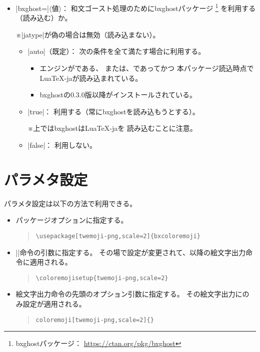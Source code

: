 \documentclass[a4paper]{ltjsarticle}
\renewcommand{\headfont}{\romanseries{sbc}\sffamily}
\newcommand{\CE}[1]{\coloremoji{#1}}
\newcommand{\Pkg}[1]{\textsf{#1}}
\newcommand{\Meta}[1]{$\langle$\mbox{}#1\mbox{}$\rangle$}
\newcommand{\Note}{\par\noindent ※}
\newcommand{\Means}{：\quad}
\newcommand{\／}{\mbox{}／\mbox{}}
\newcommand{\EG}{\eghostguarded}
\newcommand{\cs}[1]{\symbol{`\\}#1}
\providecommand{\Strong}[1]{{\headfont#1}}
\begin{document}
\begin{itemize}
\item |bxghost=|\Meta{値}\Means
  和文ゴースト処理のために\Pkg{bxghost}パッケージ
  \footnote{\Pkg{bxghost}パッケージ\Means
    \url{https://ctan.org/pkg/bxghost}}%
  を利用する（読み込む）か。
  \Note |jatype|が偽の場合は無効（読み込まない）。
  \begin{itemize}
  \item |auto|（既定）\Means
    次の条件を\Strong{全て}満たす場合に利用する。
    \begin{itemize}
    \item エンジンが\EG{(u)\pLaTeX}である、
      または、{\LuaLaTeX}であってかつ
      本パッケージ読込時点で\Pkg{LuaTeX-ja}が読み込まれている。
    \item \Pkg{bxghost}の0.3.0版以降がインストールされている。
    \end{itemize}
  \item |true|\Means
    利用する（常に\Pkg{bxghost}を読み込もうとする）。
    \Note {\LuaLaTeX}上では\Pkg{bxghost}は\Pkg{LuaTeX-ja}を
    読み込むことに注意。
  \item |false|\Means
    利用しない。
  \end{itemize}
\end{itemize}


\section{パラメタ設定}
\label{sec:Parameters}

パラメタ設定は以下の方法で利用できる。

\begin{itemize}
\item パッケージオプションに指定する。
\begin{quote}\small\begin{verbatim}
\usepackage[twemoji-png,scale=2]{bxcoloremoji}
\end{verbatim}\end{quote}
\item
  ||命令の引数に指定する。
  その場で設定が変更されて、以降の絵文字出力命令に適用される。
\begin{quote}\small\begin{verbatim}
\coloremojisetup{twemoji-png,scale=2}
\end{verbatim}\end{quote}
\item
  絵文字出力命令の先頭のオプション引数に指定する。
  その絵文字出力にのみ設定が適用される。
\begin{quote}\small\begin{alltt}
\cs{coloremoji}[twemoji-png,scale=2]\{\CE{☃}\}
\end{alltt}\end{quote}
\end{itemize}
\end{document}
